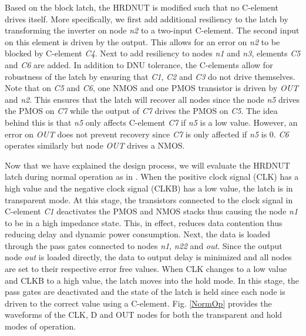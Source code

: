 Based on the block latch, the HRDNUT is modified such that no C-element drives itself. More specifically, we first add additional resiliency to the latch by transforming the inverter on node \textit{n2} to a two-input C-element. The second input on this element is driven by the output. This allows for an error on \textit{n2} to be blocked by C-element \textit{C4}. Next to add resiliency to nodes \textit{n1} and \textit{n3}, elements \textit{C5} and \textit{C6} are added. In addition to DNU tolerance, the C-elements allow for robustness of the latch by ensuring that \textit{C1}, \textit{C2} and \textit{C3} do not drive themselves. Note that on \textit{C5} and \textit{C6}, one NMOS and one PMOS transistor is driven by \textit{OUT} and \textit{n2}. This ensures that the latch will recover all nodes since the node \textit{n5} drives the PMOS on \textit{C7} while the output of \textit{C7} drives the PMOS  on \textit{C5}. The idea behind this is that \textit{n5} only affects C-element \textit{C7} if \textit{n5} is a low value. However, an error on \textit{OUT} does not prevent recovery since \textit{C7} is only affected if \textit{n5} is 0. \textit{C6} operates similarly but node \textit{OUT} drives a NMOS.

Now that we have explained the design process, we will evaluate the HRDNUT latch during normal operation as in \cite{Watkins2016}. When the positive clock signal (CLK) has a high value and the negative clock signal (CLKB) has a low value, the latch is in transparent mode. At this stage, the transistors connected to the clock signal in C-element \textit{C1} deactivates the PMOS and NMOS stacks thus causing the node \textit{n1} to be in a high impedance state. This, in effect, reduces data contention thus reducing delay and dynamic power consumption. Next, the data is loaded through the pass gates connected to nodes \textit{n1}, \textit{n22} and \textit{out}. Since the output node \textit{out} is loaded directly, the data to output delay is minimized and all nodes are set to their respective error free values. When CLK changes to a low value and CLKB to a high value, the latch moves into the hold mode. In this stage, the pass gates are deactivated and the state of the latch is held since each node is driven to the correct value using a C-element. Fig. \ref{NormOp} provides the waveforms of the CLK, D and OUT nodes for both the transparent and hold modes of operation.

